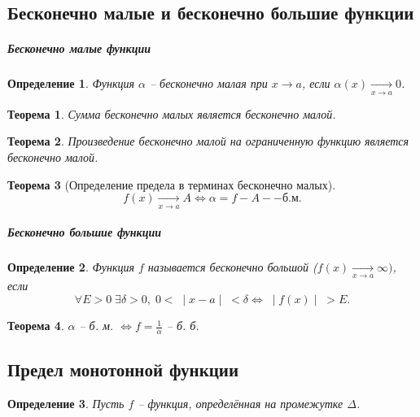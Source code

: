 \documentclass{article}
\newtheorem{Theorem}{Теорема}[section]
\newtheorem{Definition}{Определение}[section]
\begin{document}
\subsection{Бесконечно малые и бесконечно большие функции}
\subparagraph{Бесконечно малые функции}
\begin{Definition}
Функция $\alpha$ -- бесконечно малая при $x \rightarrow a$, если $\alpha(x) \xrightarrow[x \rightarrow a]{} 0$.
\end{Definition}
\begin{Theorem}Сумма бесконечно малых является бесконечно малой.\end{Theorem}
\begin{Theorem}Произведение бесконечно малой на ограниченную функцию является бесконечно малой. \end{Theorem}
\begin{Theorem}[Определение предела в терминах бесконечно малых]
$$f(x) \xrightarrow[x \rightarrow a]{} A \Leftrightarrow \alpha = f - A -- б. м.$$
\end{Theorem}
\subparagraph{Бесконечно большие функции}
\begin{Definition}Функция $f$ называется бесконечно большой ($f(x) \xrightarrow[x \rightarrow a]{} \infty)$, если
$$\forall E > 0 \; \exists \delta > 0, \; 0 < \; \mid x - a \mid \; < \delta \Leftrightarrow \; \mid f(x) \mid \; > E.$$
\end{Definition}

\begin{Theorem} $\alpha$ -- б. м. $\Leftrightarrow f = \frac{1}{\alpha}$ -- б. б. \end{Theorem}

\subsection{Предел монотонной функции}
\begin{Definition}
Пусть $f$ -- функция, определённая на промежутке $\Delta$.
\end{Definition}
\end{document}
